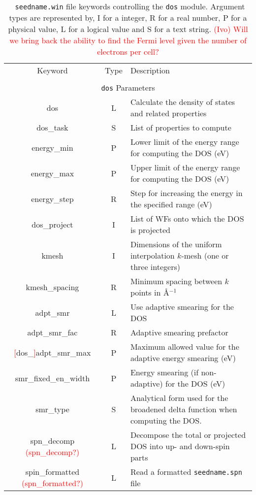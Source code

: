 \begin{table}[hH!]
\begin{center}
\begin{tabular}{|c|c|p{6cm}|}
  \hline
  Keyword & Type & Description \\
  &      &             \\
  \hline\hline
  \multicolumn{3}{|c|}{{\tt dos} Parameters} \\
  \hline
  {\sc dos}  & L & Calculate the density of states and related properties\\
  {\sc dos\_task}& S  & List of properties to compute \\
  {\sc [dos\_]energy\_min} & P & Lower limit of the energy range for
  computing the DOS (eV)\\
  {\sc [dos\_]energy\_max}& P & Upper limit of the energy range for
  computing the DOS (eV)\\
  {\sc [dos\_]energy\_step}& R & Step for increasing the energy in the specified range (eV)\\
  {\sc dos\_project}& I & List of WFs onto which the DOS is projected\\
  {\sc [dos\_]kmesh} & I & Dimensions of the uniform interpolation $k$-mesh (one or three integers)\\ 
  {\sc [dos\_]kmesh\_spacing}& R & Minimum spacing between $k$ points in \AA$^{-1}$\\
  {\sc [dos\_]adpt\_smr} & L & Use adaptive smearing for the DOS \\
  {\sc [dos\_]adpt\_smr\_fac} & R & Adaptive smearing prefactor\\
  {\sc \textcolor{red}{[}dos\_\textcolor{red}{]}adpt\_smr\_max} & P & Maximum allowed value for the adaptive energy smearing (eV) \\
  {\sc [dos\_]smr\_fixed\_en\_width} & P  & Energy smearing (if non-adaptive) for the DOS (eV) \\   
  {\sc [dos\_]smr\_type} & S & Analytical form used for the broadened delta function
  when computing the DOS. \\
  {\sc spn\_decomp} \textcolor{red}{({\sc [dos\_]spn\_decomp}?)}& L & 
Decompose the total or projected DOS into up- and down-spin parts\\
  {\sc spin\_formatted} \textcolor{red}{({\sc spn\_formatted}?)}& L & 
  Read a formatted {\tt seedname.spn} file\\
  \hline
\end{tabular}
\caption[Parameter file keywords controlling the DOS module.]  {{\tt
    seedname.win} file keywords controlling the {\tt dos}
  module. Argument types are represented by, I for a integer, R for a
  real number, P for a physical value, L for a logical value and S for
  a text string.  \textcolor{red}{(Ivo) Will we bring back the ability
    to find the Fermi level given the number of electrons per cell?}
}
\label{parameter_keywords_dos}
\end{center}
\end{table}


